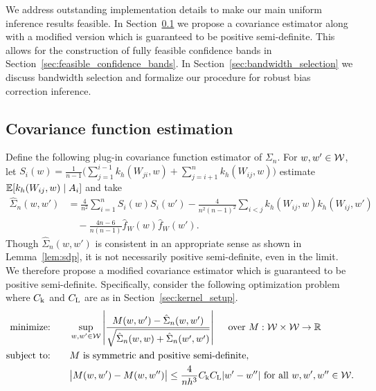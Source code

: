 We address outstanding implementation details to make our main uniform
inference results feasible. In Section~\ref{sec:covariance_estimation} we
propose a covariance estimator along with a modified version which is
guaranteed to be positive semi-definite. This allows for the construction of
fully feasible confidence bands in Section~\ref{sec:feasible_confidence_bands}.
In Section~\ref{sec:bandwidth_selection} we discuss bandwidth selection and
formalize our procedure for robust bias correction inference.

\subsection{Covariance function estimation}
\label{sec:covariance_estimation}

Define the following plug-in covariance function
estimator of $\Sigma_n$. For $w, w' \in \mathcal{W}$,
let $S_i(w) = \frac{1}{n-1} \big( \sum_{j = 1}^{i-1} k_h(W_{j i}, w)
+ \sum_{j = i+1}^n k_h(W_{i j}, w) \big)$
estimate $\mathbb{E}[k_h(W_{i j},w) \mid A_i]$ and take
%
\begin{align*}
  \hat \Sigma_n(w,w')
  &= \frac{4}{n^2} \sum_{i=1}^n S_i(w) S_i(w')
  - \frac{4}{n^2(n-1)^2} \sum_{i<j} k_h(W_{i j},w) k_h(W_{i j},w') \\
  &\quad- \frac{4n-6}{n(n-1)} \hat f_W(w) \hat f_W(w').
\end{align*}
%
Though $\hat\Sigma_n(w,w')$ is consistent in an appropriate sense as shown in
Lemma~\ref{lem:sdp}, it is not necessarily positive semi-definite, even
in the limit. We therefore propose a modified covariance estimator which is
guaranteed to be positive semi-definite. Specifically, consider the following
optimization problem where $C_{\mathrm{k}}$ and $C_{\mathrm{L}}$ are as in
Section~\ref{sec:kernel_setup}.
%
\begin{equation}
  \label{eq:sdp}
  \begin{aligned}
    \operatorname*{minimize:}
    \qquad
    & \sup_{w,w' \in \mathcal{W}}
    \left|
    \frac{M(w,w') - \hat\Sigma_n(w,w')}
    {\sqrt{\hat \Sigma_n(w,w) + \hat \Sigma_n(w',w')}}
    \right|
    \quad \textup{ over } M: \mathcal{W} \times \mathcal{W} \to \mathbb{R}
    \\
    \operatorname*{subject\ to:}
    \qquad
    & M \textup{ is symmetric and positive semi-definite}, \\
    & \big|M(w,w') - M(w, w'')\big|
    \leq \frac{4}{n h^3}
    C_{\mathrm{k}} C_{\mathrm{L}}
    |w'-w''|
    \textup{ for all }
    w, w', w'' \in \mathcal{W}.
  \end{aligned}
\end{equation}

